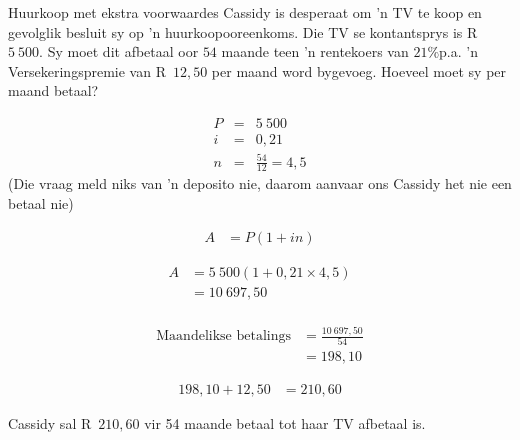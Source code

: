 \begin{wex}{Huurkoop met ekstra voorwaardes}{
    Cassidy is desperaat om 'n TV te koop en gevolglik besluit sy op 'n huurkoopooreenkoms. Die TV se kontantsprys is R~$5~500$. Sy moet dit afbetaal oor $54$ maande teen 'n rentekoers van $21\%$p.a. 'n Versekeringspremie van R~$12,50$ per maand word bygevoeg. Hoeveel moet sy per maand betaal?}{

    \begin{eqnarray*}
	P &=& 5~500\\
	i &=& 0,21\\
	n &=& \frac{54}{12} = 4,5
    \end{eqnarray*}
(Die vraag meld niks van 'n deposito nie, daarom aanvaar ons Cassidy het nie een betaal nie)

    \begin{align*}
	    A &= P(1 + in)
    \end{align*}

    \begin{align*}
	A &= 5~500(1 + 0,21 \times 4,5)\\
	  &= 10~697,50\\
    \end{align*}

    \begin{align*}
	\mbox{Maandelikse betalings} &= \frac{10~697,50}{54}\\
			&= 198,10
    \end{align*}

    \begin{align*}
	198,10 + 12,50 &= 210,60
    \end{align*}

    Cassidy sal R~$210,60$ vir 54 maande betaal tot haar TV afbetaal is.
}
\end{wex}


